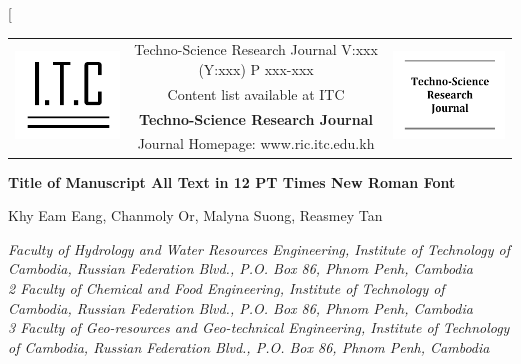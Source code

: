\documentclass[10pt,letterpaper,twocolumn]{article}
\begin{document}
\twocolumn[  
\begin{@twocolumnfalse}

%	
%
%
	
	{\renewcommand{\arraystretch}{2}
		\begin{tabular}{lcr}
			\multirow{4}{*}{\includegraphics[width=0.2\linewidth]{logo1.PNG}} & Techno-Science Research Journal V:xxx (Y:xxx) P xxx-xxx  & \multirow{4}{*}{\includegraphics[width=0.2\linewidth]{logo2.PNG}} \\
			& Content list available at ITC &                      \\
			& \LARGE
			\textbf{Techno-Science Research Journal} &                      \\
			& Journal Homepage: www.ric.itc.edu.kh  &                     
		\end{tabular}
	}
	
	\begin{center}
	\large
	\textbf{Title of Manuscript All Text in 12 PT Times New Roman Font}
	\end{center}

	\begin{center}
	Khy Eam Eang\footnotemark, Chanmoly Or, Malyna Suong, Reasmey Tan
	\end{center}

	\begin{center}
	\textit{
	Faculty of Hydrology and Water Resources Engineering, Institute of Technology of Cambodia, Russian Federation Blvd., P.O. Box 86, Phnom Penh, Cambodia\\
	2 Faculty of Chemical and Food Engineering, Institute of Technology of Cambodia, Russian Federation Blvd., P.O. Box 86, Phnom Penh, Cambodia\\
	3 Faculty of Geo-resources and Geo-technical Engineering, Institute of Technology of Cambodia, Russian Federation Blvd., P.O. Box 86, Phnom Penh, Cambodia
	}
	\end{center}


\end{@twocolumnfalse}
\end{document}
